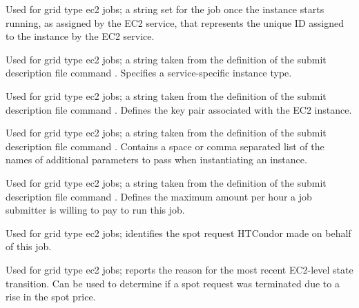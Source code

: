 \begin{description}
\item[\AdAttr{EC2InstanceName}:] 
Used for grid type ec2 jobs;
a string set for the job once the instance starts running, 
as assigned by the EC2 service, 
that represents the unique ID assigned to the instance by the EC2 service.

\item[\AdAttr{EC2InstanceType}:] 
Used for grid type ec2 jobs;
a string taken from the definition of the submit description file command
.
Specifies a service-specific instance type.

\item[\AdAttr{EC2KeyPair}:] 
Used for grid type ec2 jobs;
a string taken from the definition of the submit description file command
.
Defines the key pair associated with the EC2 instance. 

\item[\AdAttr{EC2ParameterNames}:]
Used for grid type ec2 jobs;
a string taken from the definition of the submit description file command
.
Contains a space or comma separated list of the names of additional
parameters to pass when instantiating an instance.

\item[\AdAttr{EC2SpotPrice}:] 
Used for grid type ec2 jobs;
a string taken from the definition of the submit description file command
.
Defines the maximum amount per hour a job submitter is willing to 
pay to run this job.

\item[\AdAttr{EC2SpotRequestID}:] 
Used for grid type ec2 jobs;
identifies the spot request HTCondor made on behalf of this job.

\item[\AdAttr{EC2StatusReasonCode}:] 
Used for grid type ec2 jobs;
reports the reason for the most recent EC2-level state transition.
Can be used to determine if a spot request was terminated
due to a rise in the spot price.


\end{description}
